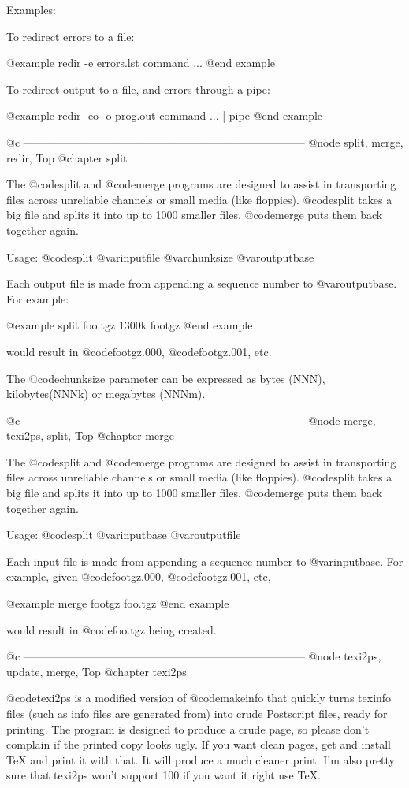 Examples:

To redirect errors to a file:

@example
redir -e errors.lst command ...
@end example

To redirect output to a file, and errors through a pipe:

@example
redir -eo -o prog.out command ... | pipe
@end example

@c -----------------------------------------------------------------------------
@node split, merge, redir, Top
@chapter split

The @code{split} and @code{merge} programs are designed to assist in
transporting files across unreliable channels or small media (like
floppies).  @code{split} takes a big file and splits it into up to 1000
smaller files.  @code{merge} puts them back together again.

Usage: @code{split} @var{inputfile} @var{chunksize} @var{outputbase}

Each output file is made from appending a sequence number to
@var{outputbase}.  For example:

@example
split foo.tgz 1300k footgz
@end example

would result in @code{footgz.000}, @code{footgz.001}, etc.

The @code{chunksize} parameter can be expressed as bytes (NNN),
kilobytes(NNNk) or megabytes (NNNm).

@c -----------------------------------------------------------------------------
@node merge, texi2ps, split, Top
@chapter merge

The @code{split} and @code{merge} programs are designed to assist in
transporting files across unreliable channels or small media (like
floppies).  @code{split} takes a big file and splits it into up to 1000
smaller files.  @code{merge} puts them back together again.

Usage: @code{split} @var{inputbase} @var{outputfile}

Each input file is made from appending a sequence number to
@var{inputbase}.  For example, given @code{footgz.000},
@code{footgz.001}, etc,

@example
merge footgz foo.tgz
@end example

would result in @code{foo.tgz} being created.

@c -----------------------------------------------------------------------------
@node texi2ps, update, merge, Top
@chapter texi2ps

@code{texi2ps} is a modified version of @code{makeinfo} that quickly turns
texinfo files (such as info files are generated from) into crude
Postscript files, ready for printing.  The program is designed to
produce a crude page, so please don't complain if the printed copy looks
ugly.  If you want clean pages, get and install TeX and print it with
that.  It will produce a much cleaner print.  I'm also pretty sure that
texi2ps won't support 100%
if you want it right use TeX.

